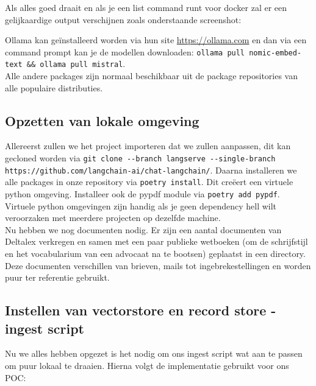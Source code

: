 Als alles goed draait en als je een list command runt voor docker zal er een gelijkaardige output verschijnen zoals onderstaande screenshot:
\begin{figure}[h]
\end{figure}

Ollama kan geïnstalleerd worden via hun site \url{https://ollama.com} en dan via een command prompt kan je de modellen downloaden: \lstinline{ollama pull nomic-embed-text && ollama pull mistral}. \\

Alle andere packages zijn normaal beschikbaar uit de package repositories van alle populaire distributies.

\subsection{Opzetten van lokale omgeving}
Allereerst zullen we het project importeren dat we zullen aanpassen, dit kan gecloned worden via \lstinline{git clone --branch langserve --single-branch https://github.com/langchain-ai/chat-langchain/}.
Daarna installeren we alle packages in onze repository via \lstinline{poetry install}. Dit creëert een virtuele python omgeving. Installeer ook de pypdf module via \lstinline{poetry add pypdf}.
Virtuele python omgevingen zijn handig als je geen dependency hell wilt veroorzaken met meerdere projecten op dezelfde machine. \\

Nu hebben we nog documenten nodig.
Er zijn een aantal documenten van Deltalex verkregen en samen met een paar publieke wetboeken (om de schrijfstijl en het vocabularium van een advocaat na te bootsen) geplaatst in een directory.
Deze documenten verschillen van brieven, mails tot ingebrekestellingen en worden puur ter referentie gebruikt.

\subsection{Instellen van vectorstore en record store - ingest script}
Nu we alles hebben opgezet is het nodig om ons ingest script wat aan te passen om puur lokaal te draaien. Hierna volgt de implementatie gebruikt voor ons POC:

